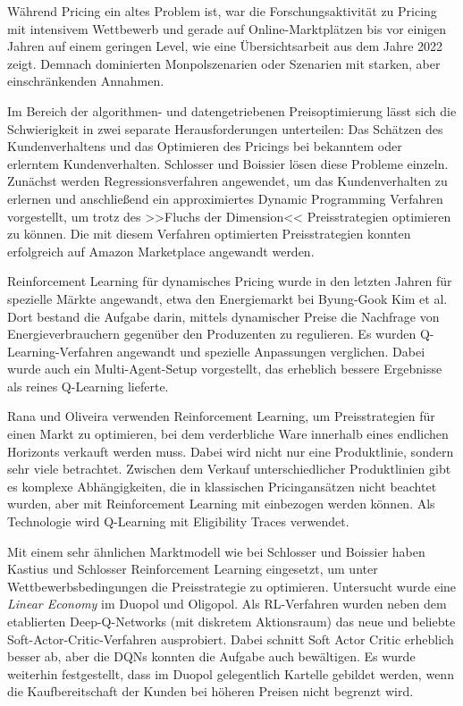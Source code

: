 Während Pricing ein altes Problem ist, war die Forschungsaktivität zu Pricing mit intensivem Wettbewerb und gerade auf Online-Marktplätzen bis vor einigen Jahren auf einem geringen Level, wie eine Übersichtsarbeit aus dem Jahre 2022 zeigt. \cite{Gerpott2022}
Demnach dominierten Monpolszenarien oder Szenarien mit starken, aber einschränkenden Annahmen.

Im Bereich der algorithmen- und datengetriebenen Preisoptimierung lässt sich die Schwierigkeit in zwei separate Herausforderungen unterteilen: Das Schätzen des Kundenverhaltens und das Optimieren des Pricings bei bekanntem oder erlerntem Kundenverhalten.
Schlosser und Boissier \cite{10.1145/3219819.3219833} lösen diese Probleme einzeln.
Zunächst werden Regressionsverfahren angewendet, um das Kundenverhalten zu erlernen und anschließend ein approximiertes Dynamic Programming Verfahren vorgestellt, um trotz des >>Fluchs der Dimension<< Preisstrategien optimieren zu können.
Die mit diesem Verfahren optimierten Preisstrategien konnten erfolgreich auf Amazon Marketplace angewandt werden.

Reinforcement Learning für dynamisches Pricing wurde in den letzten Jahren für spezielle Märkte angewandt, etwa den Energiemarkt bei Byung-Gook Kim et al. \cite{Kim2016DynamicPA}
Dort bestand die Aufgabe darin, mittels dynamischer Preise die Nachfrage von Energieverbrauchern gegenüber den Produzenten zu regulieren.
Es wurden Q-Learning-Verfahren angewandt und spezielle Anpassungen verglichen.
Dabei wurde auch ein Multi-Agent-Setup vorgestellt, das erheblich bessere Ergebnisse als reines Q-Learning lieferte.

Rana und Oliveira \cite{RANA2015426} verwenden Reinforcement Learning, um Preisstrategien für einen Markt zu optimieren, bei dem verderbliche Ware innerhalb eines endlichen Horizonts verkauft werden muss.
Dabei wird nicht nur eine Produktlinie, sondern sehr viele betrachtet.
Zwischen dem Verkauf unterschiedlicher Produktlinien gibt es komplexe Abhängigkeiten, die in klassischen Pricingansätzen nicht beachtet wurden, aber mit Reinforcement Learning mit einbezogen werden können.
Als Technologie wird Q-Learning mit Eligibility Traces verwendet.

Mit einem sehr ähnlichen Marktmodell wie bei Schlosser und Boissier haben Kastius und Schlosser \cite{Kastius2022} Reinforcement Learning eingesetzt, um unter Wettbewerbsbedingungen die Preisstrategie zu optimieren.
Untersucht wurde eine \textit{Linear Economy} im Duopol und Oligopol.
Als RL-Verfahren wurden neben dem etablierten Deep-Q-Networks (mit diskretem Aktionsraum) das neue und beliebte Soft-Actor-Critic-Verfahren ausprobiert.
Dabei schnitt Soft Actor Critic erheblich besser ab, aber die DQNs konnten die Aufgabe auch bewältigen.
Es wurde weiterhin festgestellt, dass im Duopol gelegentlich Kartelle gebildet werden, wenn die Kaufbereitschaft der Kunden bei höheren Preisen nicht begrenzt wird.

